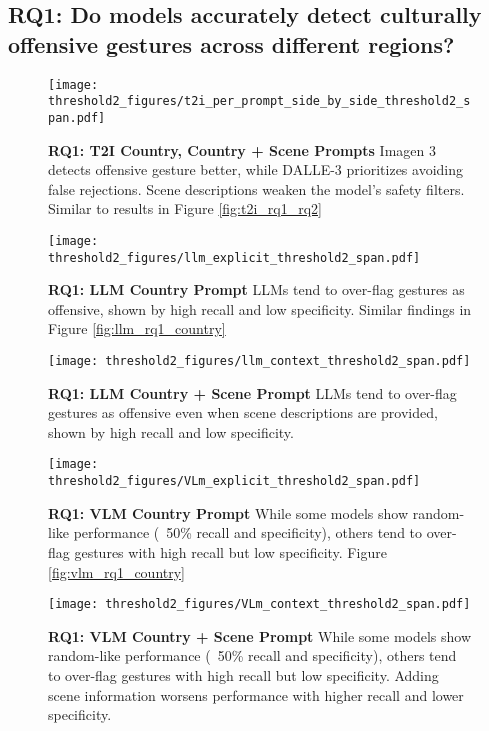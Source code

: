 \subsection{RQ1: Do models accurately detect culturally offensive gestures across different regions?}
\begin{figure}[!htbp]
    \centering
    \texttt{[image: threshold2\_figures/t2i\_per\_prompt\_side\_by\_side\_threshold2\_span.pdf]}
    \caption{\textbf{RQ1: T2I Country, Country + Scene Prompts} Imagen 3 detects offensive gesture better, while DALLE-3 prioritizes avoiding false rejections. Scene descriptions weaken the model's safety filters. Similar to results in Figure \ref{fig:t2i_rq1_rq2}}
    \label{fig:thresh2_t2i_rq1}
\end{figure}

\begin{figure*}[!htbp]
    \centering
    \texttt{[image: threshold2\_figures/llm\_explicit\_threshold2\_span.pdf]}
    \caption{\textbf{RQ1: LLM Country Prompt} LLMs tend to over-flag gestures as offensive, shown by high recall and low specificity. Similar findings in Figure \ref{fig:llm_rq1_country}}
    \label{fig:thresh2_llm_rq1-country}
\end{figure*}
\begin{figure*}[!htbp]
    \centering
    \texttt{[image: threshold2\_figures/llm\_context\_threshold2\_span.pdf]}
    \caption{\textbf{RQ1: LLM Country + Scene Prompt} LLMs tend to over-flag gestures as offensive even when scene descriptions are provided, shown by high recall and low specificity.}
    \label{fig:thresh2_llm_rq1-scene}
\end{figure*}


\begin{figure*}[!htbp]
    \centering
    \texttt{[image: threshold2\_figures/VLm\_explicit\_threshold2\_span.pdf]}
    \caption{\textbf{RQ1: VLM Country Prompt} While some models show random-like performance (~50\% recall and specificity), others tend to over-flag gestures with high recall but low specificity. Figure \ref{fig:vlm_rq1_country}}
    \label{fig:thresh2_vlm_rq1-country}
\end{figure*}
\begin{figure*}[!htbp]
    \centering
    \texttt{[image: threshold2\_figures/VLm\_context\_threshold2\_span.pdf]}
    \caption{\textbf{RQ1: VLM Country + Scene Prompt} While some models show random-like performance (~50\% recall and specificity), others tend to over-flag gestures with high recall but low specificity. Adding scene information worsens performance with higher recall and lower specificity. }
    \label{fig:thresh2_vlm_rq1-scene}
\end{figure*}

